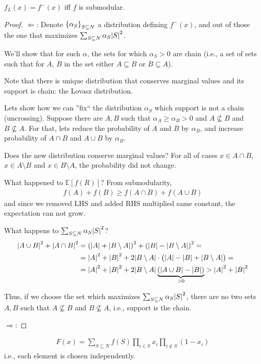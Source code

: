 \begin{theorem}
	$f_L(x) = f^-(x)$ iff $f$ is submodular.
	\begin{proof}
		$\Leftarrow$:
		Denote $\qty{ \alpha_S}_{S\subseteq N}$ a distribution defining $f^-(x)$, and out of those the one that maximizes $\sum_{S \subseteq N} \alpha_S \abs{S}^2$.
		
		We'll show that for such $\alpha$, the sets for which $\alpha_S >0$ are chain (i.e., a set of sets such that for $A$, $B$ in the set either $A\subseteq B$ or $B\subseteq A$).
		
		Note that there is unique distribution that conserves marginal values and its support is chain: the Lovasz distribution. 
		
		Lets show how we can ''fix`` the distribution $\alpha_S$ which support is not a chain (uncrossing). Suppose there are $A,B$ such that $\alpha_A\geqslant \alpha_B >0$ and $A\not\subseteq B$ and  $B\not\subseteq A$.
		For that, lets reduce the probability of $A$ and $B$ by $\alpha_B$, and increase probability of $A\cap B$ and $A\cup B$ by $\alpha_B$.
		
		Does the new distribution conserve marginal values? For all of cases $x\in A\cap B$, $x\in A\setminus B$ and $x\in B\setminus A$, the probability did not change.
		
		What happened to $\mathbb{E} [f(R)]$? From submodularity,
		\begin{align}
		f(A) + f(B) \geqslant f(A\cap B) + f(A\cup B)
		\end{align}
		and since we removed LHS and added RHS multiplied same constant, the expectation can not grow.
		
		What happens to $\sum_{S \subseteq N} \alpha_S \abs{S}^2$?
		\begin{align}
		\abs{A\cup B}^2 + \abs{A\cap B}^2 &= \qty(\abs{A} + \abs{B\setminus A})^2 + \qty(\abs{B} - \abs{B\setminus A})^2 =\\&= \abs{A}^2+\abs{B}^2 + 2\abs{B\setminus A} \cdot \qty\big(\abs{A} - \abs{B} + \abs{B\setminus A}) =\\&= \abs{A}^2+\abs{B}^2 + 2\abs{B\setminus A}\underbrace{ \qty(\abs{A\cup B} - \abs{B})}_{>0} >  \abs{A}^2+\abs{B}^2
		\end{align}
		
		Thus, if we choose the set which maximizes $\sum_{S \subseteq N} \alpha_S \abs{S}^2$, there are no two sets $A,B$ such that $A\not\subseteq B$ and $B \not\subseteq A$, i.e., support is the chain.
		
		
		
		$\Rightarrow$:
	\end{proof}
\end{theorem}


\begin{definition}
	\begin{align}
	F(x) = \sum_{S \subseteq N} f(S) \prod_{i\in S} x_i \prod_{i \notin S} (1-x_i)
	\end{align}
	i.e., each element is chosen independently.
\end{definition}
